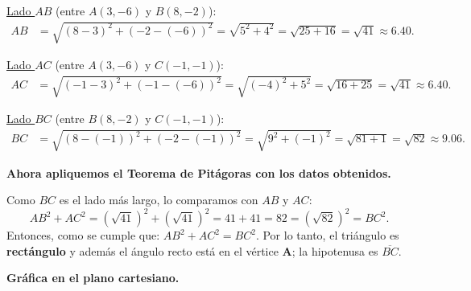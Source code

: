 \documentclass[12pt,a4paper]{article}
\begin{document}
	\vspace{3mm}
	
	\underline{Lado \(AB\)} (entre \(A(3,-6)\) y \(B(8,-2)\)):
	\[
	\begin{aligned}
		AB &= \sqrt{(8-3)^2+(-2-(-6))^2}
		= \sqrt{5^2+4^2}
		= \sqrt{25+16}
		= \sqrt{41}\approx 6.40.
	\end{aligned}
	\]
	
	\underline{Lado \(AC\)} (entre \(A(3,-6)\) y \(C(-1,-1)\)):
	\[
	\begin{aligned}
		AC &= \sqrt{(-1-3)^2+(-1-(-6))^2}
		= \sqrt{(-4)^2+5^2}
		= \sqrt{16+25}
		= \sqrt{41}\approx 6.40.
	\end{aligned}
	\]
	
	\underline{Lado \(BC\)} (entre \(B(8,-2)\) y \(C(-1,-1)\)):
	\[
	\begin{aligned}
		BC &= \sqrt{(8-(-1))^2+(-2-(-1))^2}
		= \sqrt{9^2+(-1)^2}
		= \sqrt{81+1}
		= \sqrt{82}\approx 9.06.
	\end{aligned}
	\]
	
	\bigskip
	
	\textbf{Ahora apliquemos el Teorema de Pitágoras con los datos obtenidos.}
	
	Como \(BC\) es el lado más largo, lo comparamos con \(AB\) y \(AC\):
	\[
	AB^2+AC^2=(\sqrt{41})^2+(\sqrt{41})^2=41+41=82=(\sqrt{82})^2=BC^2.
	\]
	Entonces, como se cumple que: \(AB^2+AC^2=BC^2\). Por lo tanto, el triángulo es \textbf{rectángulo} y además el ángulo recto está en el vértice \(\mathbf{A}\); la hipotenusa es \(\overline{BC}\).
	
	\bigskip
	
	\textbf{Gráfica en el plano cartesiano.}
	
\end{document}
